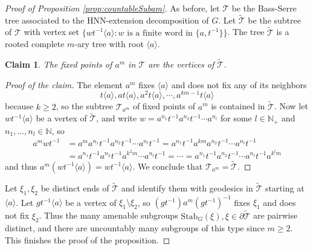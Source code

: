 \documentclass[reqno,a4paper,11pt]{amsart}
\numberwithin{equation}{section}
\newcommand{\1}{\mathbf{1}}
\def\N{{\mathbb N}}
\def\cT{{\mathcal T}}
\newtheorem*{claim}{Claim}
\theoremstyle{definition}
\begin{document}
\begin{proof}[Proof of Proposition \ref{prop:countableSubam}]
	As before, let $\cT$ be the Bass-Serre tree associated to the HNN-extension decomposition of $G$. Let $\widetilde{\cT}$ be the subtree of $\cT$ with vertex set $\{wt^{-1} \langle a \rangle : w \text{ is a finite word in }\{a, t^{-1}\} \}$. The tree $\widetilde{\cT}$ is a rooted complete $m$-ary tree with root $\langle a \rangle$.
	
	\begin{claim}
		The fixed points of $a^m$ in $\cT$ are the vertices of $\widetilde{\cT}$.
	\end{claim}
	\begin{proof}[Proof of the claim]
		The element $a^m$ fixes $\langle a \rangle$ and does not fix any of its neighbors
		\[
		t\langle a \rangle, at \langle a \rangle, a^2t\langle a \rangle, \cdots, a^{km-1}t \langle a \rangle
		\]
		because $k \geq 2$, so the subtree $\cT_{a^m}$ of fixed points of $a^m$ is contained in $\widetilde{\cT}$. Now let $wt^{-1} \langle a \rangle$ be a vertex of $\widetilde{\cT}$, and write $w = a^{n_1}t^{-1} a^{n_2} t^{-1} \cdots a^{n_l}$ for some $l \in \N_+$ and $n_1, \ldots, n_l \in \N$, so
		\begin{align*}
			a^mw t^{-1} & = a^m a^{n_1}t^{-1} a^{n_2} t^{-1} \cdots a^{n_l}t^{-1} = a^{n_1} t^{-1}a^{km} a^{n_2}t^{-1} \cdots a^{n_l}t^{-1} \\
			& = a^{n_1} t^{-1}a^{n_2}t^{-1}a^{k^2m} \cdots a^{n_l}t^{-1} = \cdots = a^{n_1} t^{-1}a^{n_2}t^{-1} \cdots a^{n_l}t^{-1}a^{k^l m}
		\end{align*}
		and thus $a^m(w t^{-1} \langle a \rangle) = w t^{-1} \langle a \rangle$. We conclude that $\cT_{a^m} = \widetilde{\cT}$.
	\end{proof}
	
	Let $\xi_1, \xi_2$ be distinct ends of $\widetilde{\cT}$ and identify them with geodesics in $\widetilde{\cT}$ starting at $\langle a \rangle$. Let $gt^{-1} \langle a \rangle$ be a vertex of $\xi_1 \setminus \xi_2$, so $(gt^{-1}) a^m(gt^{-1})^{-1}$ fixes $\xi_1$ and does not fix $\xi_2$. Thus the many amenable subgroups $\mathrm{Stab}_G(\xi), \xi \in \partial \widetilde{\cT}$ are pairwise distinct, and there are uncountably many subgroups of this type since $m \geq 2$. This finishes the proof of the proposition.
\end{proof}
\end{document}
